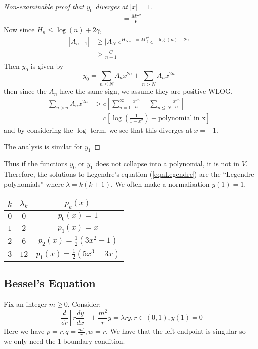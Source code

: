 \documentclass[../Main.tex]{subfiles}
\begin{document}
\begin{proof}[Non-examinable proof that $y_0$ diverges at $|x| = 1$]
\begin{align*}
        &= \frac{M\pi^2}{6}
    \end{align*}
    Now since $H_n \leq \log(n) + 2\gamma$,
    \begin{align*}
        |A_{n+1}| &\geq |A_N| e^{H_{N-1} = M\frac{\pi^2}{6}} e^{-\log(n) - 2\gamma} \\
        &> \frac{C}{n+1}
    \end{align*}       
    Then $y_0$ is given by:
    \begin{equation*}
        y_0 = \sum_{n \leq N} A_n x^{2n} + \sum_{n > N} A_nx^{2n}
    \end{equation*}
    then since the $A_n$ have the same sign, we assume they are positive WLOG.
    \begin{align*}
        \sum_{n > n} A_n x^{2n} &> c\left[\sum_{n=1}^\infty \frac{x^{2n}}{n} - \sum_{n \leq N}  \frac{x^{2n}}{n}\right] \\
        &= c\left[\log\left(\frac{1}{1-x^2}\right) - \text{polynomial in x}\right]
    \end{align*}
    and by considering the $\log$ term, we see that this diverges at $x = \pm 1$.

    The analysis is similar for $y_1$
\end{proof}
Thus if the functions $y_0$ or $y_1$ does not collapse into a polynomial, it is not in $V$. Therefore, the solutions to Legendre's equation (\ref{eqnLegendre}) are the ``Legendre polynomials'' where $\lambda = k(k+1)$. We often make a normalisation $y(1) = 1$.

\begin{tabular}{|c|c|c|}
    \hline
    $k$ & $\lambda_k$ & $p_k(x)$ \\
    \hline
    $0$ & $0$ & $p_0(x) = 1$ \\
    $1$ & $2$ & $p_1(x) = x$ \\
    $2$ & $6$ & $p_2(x) = \frac12(3x^2-1)$ \\
    $3$ & $12$ & $p_1(x) = \frac12(5x^3-3x)$ \\
    \hline
\end{tabular}
\subsection{Bessel's Equation}
Fix an integer $m \geq 0$. Consider:
\begin{equation}
    -\frac{d}{dr} \left[r \frac{dy}{dx}\right] + \frac{m^2}{r}y = \lambda r y, r \in (0, 1), y(1) = 0
    \label{eqnBesselSL}
\end{equation}
Here we have $p = r, q = \frac{m^2}{r}, w = r$. We have that the left endpoint is singular so we only need the 1 boundary condition.
\end{document}
